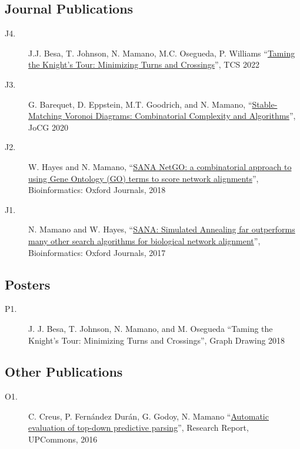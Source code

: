\documentclass[letterpaper,10pt,oneside]{article}
\begin{document}
\subsection*{Journal Publications}
\begin{description}
\item[J4.] J.J. Besa, T. Johnson, N. Mamano, M.C. Osegueda, P. Williams ``\href{https://arxiv.org/pdf/1904.02824.pdf}{Taming the Knight's Tour: Minimizing Turns and Crossings}'', TCS 2022	
\item[J3.] G. Barequet, D. Eppstein, M.T. Goodrich, and N. Mamano, ``\href{https://arxiv.org/pdf/1804.09411.pdf}{Stable-Matching Voronoi Diagrams: Combinatorial Complexity and Algorithms}'', JoCG 2020
\item[J2.] W. Hayes and N. Mamano, ``\href{https://academic.oup.com/bioinformatics/article/34/8/1345/4708230}{SANA NetGO: a combinatorial approach to using Gene Ontology (GO) terms to score network alignments}'', Bioinformatics: Oxford Journals, 2018
\item[J1.] N. Mamano and W. Hayes, ``\href{https://academic.oup.com/bioinformatics/article/33/14/2156/2996219}{SANA: Simulated Annealing far outperforms many other search algorithms for biological network alignment}'', Bioinformatics: Oxford Journals, 2017
\end{description}
\subsection*{Posters}
\begin{description}
	\item[P1.] J. J. Besa, T. Johnson, N. Mamano, and M. Osegueda ``Taming the Knight's Tour: Minimizing Turns and Crossings'', Graph Drawing 2018
\end{description}
\subsection*{Other Publications }
\begin{description}
	\item[O1.] C. Creus, P. Fernández Durán, G. Godoy, N. Mamano
	 ``\href{https://upcommons.upc.edu/bitstream/handle/2117/119781/Automatic\%20evaluation\%20of\%20top-down\%20predictive\%20parsing.pdf?sequence=1\&isAllowed=y}{Automatic evaluation of top-down predictive parsing}'', Research Report, UPCommons, 2016
\end{description}
\end{document}
